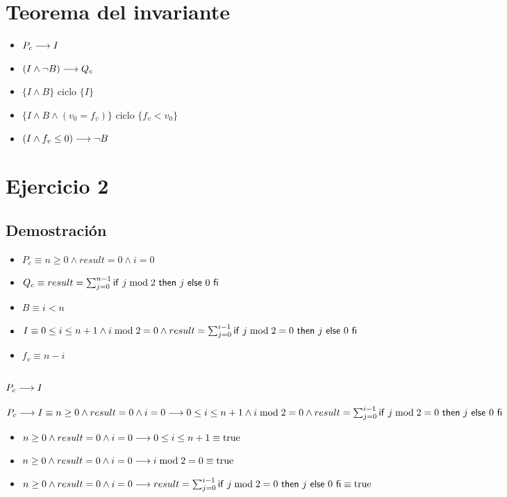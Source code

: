 \documentclass{article}
\begin{document}
\section*{Teorema del invariante}
\begin{itemize}
    \item $P_{c} \longrightarrow I$
    \item $(I \wedge \neg B) \longrightarrow Q_{c}$
    \item $\{I \wedge B\}$ ciclo $\{ I \}$
    \item $\{I \wedge B \wedge (v_{0} = f_{v})\}$ ciclo $\{f_{v} < v_{0}\}$
    \item $(I \wedge f_{v} \leq 0) \longrightarrow \neg B$
\end{itemize}

\section*{Ejercicio 2}

\subsection*{Demostración}

\begin{itemize}
    \item $P_{c} \equiv n \geq 0 \wedge result = 0 \wedge i = 0$
    \item $Q_{c} \equiv result = \sum_{j=0}^{n-1} \mathsf{if}\ j \bmod 2\ \mathsf{then}\ j\ \mathsf{else}\ 0\ \mathsf{fi}$
    \item $B \equiv i < n$
    \item $I \equiv 0 \leq i \leq n+1 \wedge i \bmod 2 = 0 \wedge result = \sum_{j=0}^{i-1} \mathsf{if}\ j \bmod 2 = 0\ \mathsf{then}\ j\ \mathsf{else}\ 0\ \mathsf{fi}$
    \item $f_{v} \equiv n-i$
\end{itemize}

\subsubsection*{$P_{c} \longrightarrow I$}

$P_{c} \longrightarrow I \equiv 
    n \geq 0 \wedge result = 0 \wedge i = 0 \longrightarrow 
    0 \leq i \leq n+1 \wedge i \bmod 2 = 0 \wedge result = \sum_{j=0}^{i-1} \mathsf{if}\ j \bmod 2 = 0\ \mathsf{then}\ j\ \mathsf{else}\ 0\ \mathsf{fi}$

    \begin{itemize}
        \item $n \geq 0 \wedge result = 0 \wedge i = 0 \longrightarrow 0 \leq i \leq n+1 \equiv \mathrm{true}$
        \item $n \geq 0 \wedge result = 0 \wedge i = 0 \longrightarrow i \bmod 2 = 0 \equiv \mathrm{true}$
        \item $n \geq 0 \wedge result = 0 \wedge i = 0 \longrightarrow result = \sum_{j=0}^{i-1} \mathsf{if}\ j \bmod 2 = 0\ \mathsf{then}\ j\ \mathsf{else}\ 0\ \mathsf{fi} \equiv \mathrm{true}$
    \end{itemize}
\end{document}

